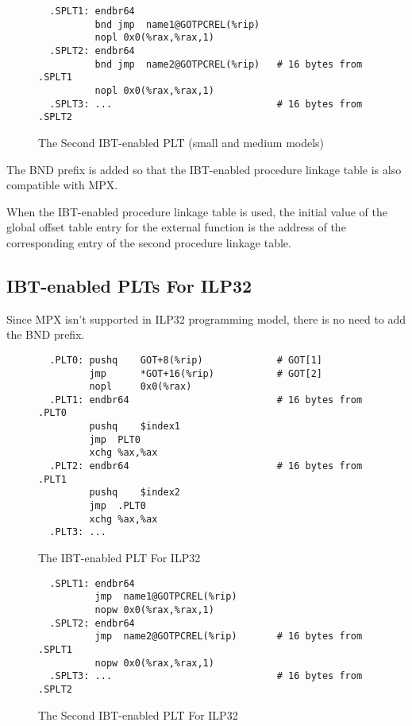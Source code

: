 \begin{figure}[H]
\Hrule
\caption{The Second IBT-enabled PLT (small and medium models)}
\label{ibt_sec_small_med_plt}
\begin{footnotesize}
\begin{verbatim}
  .SPLT1: endbr64
          bnd jmp  name1@GOTPCREL(%rip)
          nopl 0x0(%rax,%rax,1)
  .SPLT2: endbr64
          bnd jmp  name2@GOTPCREL(%rip)   # 16 bytes from .SPLT1
          nopl 0x0(%rax,%rax,1)
  .SPLT3: ...                             # 16 bytes from .SPLT2
\end{verbatim}%
\end{footnotesize}
\Hrule
\end{figure}

The BND prefix is added so that the IBT-enabled procedure linkage table is
also compatible with MPX.

When the IBT-enabled procedure linkage table is used, the initial value of
the global offset table entry for the external function is the address of
the corresponding entry of the second procedure linkage table.

\subsection{IBT-enabled PLTs For ILP32}

Since MPX isn't supported in ILP32 programming model, there is no
need to add the BND prefix.

\begin{figure}[H]
\Hrule
\caption{The IBT-enabled PLT For ILP32}
\label{ibt_small_med_plt}
\begin{footnotesize}
\begin{verbatim}
  .PLT0: pushq    GOT+8(%rip)             # GOT[1]
         jmp      *GOT+16(%rip)           # GOT[2]
         nopl     0x0(%rax)
  .PLT1: endbr64                          # 16 bytes from .PLT0
         pushq    $index1
         jmp  PLT0
         xchg %ax,%ax
  .PLT2: endbr64                          # 16 bytes from .PLT1
         pushq    $index2
         jmp  .PLT0
         xchg %ax,%ax
  .PLT3: ...
\end{verbatim}%
\end{footnotesize}
\Hrule
\end{figure}

\begin{figure}[H]
\Hrule
\caption{The Second IBT-enabled PLT For ILP32}
\label{ibt_sec_small_med_plt}
\begin{footnotesize}
\begin{verbatim}
  .SPLT1: endbr64
          jmp  name1@GOTPCREL(%rip)
          nopw 0x0(%rax,%rax,1)
  .SPLT2: endbr64
          jmp  name2@GOTPCREL(%rip)       # 16 bytes from .SPLT1
          nopw 0x0(%rax,%rax,1)
  .SPLT3: ...                             # 16 bytes from .SPLT2
\end{verbatim}%
\end{footnotesize}
\Hrule
\end{figure}

